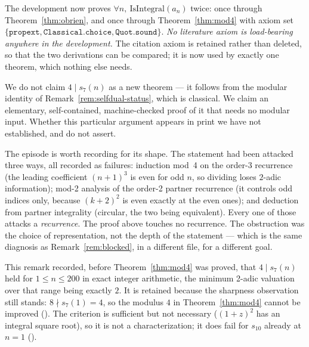 \begin{remark}\label{rem:mod4-status}
The development now proves $\forall n,\ \text{IsIntegral}(a_n)$ twice: once
through Theorem~\ref{thm:obrien}, and once through Theorem~\ref{thm:mod4} with
axiom set $\{\mathtt{propext},\mathtt{Classical.choice},\mathtt{Quot.sound}\}$.
\emph{No literature axiom is load-bearing anywhere in the development.} The
citation axiom is retained rather than deleted, so that the two derivations can
be compared; it is now used by exactly one theorem, which nothing else needs.

We do not claim $4\mid s_7(n)$ as a new theorem --- it follows from the modular
identity of Remark~\ref{rem:selfdual-status}, which is classical. We claim an
elementary, self-contained, machine-checked proof of it that needs no modular
input. Whether this particular argument appears in print we have not
established, and do not assert.

The episode is worth recording for its shape. The statement had been attacked
three ways, all recorded as failures: induction mod~4 on the order-3 recurrence
(the leading coefficient $(n+1)^3$ is even for odd $n$, so dividing loses
$2$-adic information); mod-2 analysis of the order-2 partner recurrence (it
controls odd indices only, because $(k+2)^2$ is even exactly at the even ones);
and deduction from partner integrality (circular, the two being equivalent).
Every one of those attacks a \emph{recurrence}. The proof above touches no
recurrence. The obstruction was the choice of representation, not the depth of
the statement --- which is the same diagnosis as Remark~\ref{rem:blocked}, in a
different file, for a different goal.
\end{remark}

\begin{remark}\label{rem:pass200}
This remark recorded, before Theorem~\ref{thm:mod4} was proved, that
$4\mid s_7(n)$ held for $1\leq n\leq200$ in exact integer arithmetic, the minimum
2-adic valuation over that range being exactly $2$. It is retained because the
sharpness observation still stands: $8\nmid s_7(1)=4$, so the modulus $4$ in
Theorem~\ref{thm:mod4} cannot be improved ().
The criterion is sufficient but not necessary ($(1+z)^2$ has an integral square
root), so it is not a characterization; it does fail for $s_{10}$ already at
$n=1$ ().
\end{remark}

